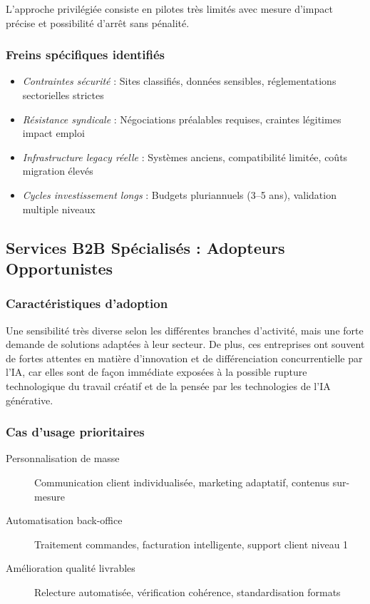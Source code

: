 L'approche privilégiée consiste en pilotes très limités avec mesure d'impact précise et possibilité d'arrêt sans pénalité.

\subsubsection{Freins spécifiques identifiés}
\begin{itemize}
    \item \emph{Contraintes sécurité} : Sites classifiés, données sensibles, réglementations sectorielles strictes
    \item \emph{Résistance syndicale} : Négociations préalables requises, craintes légitimes impact emploi
    \item \emph{Infrastructure legacy réelle} : Systèmes anciens, compatibilité limitée, coûts migration élevés
    \item \emph{Cycles investissement longs} : Budgets pluriannuels (3--5 ans), validation multiple niveaux
\end{itemize}

\subsection{Services B2B Spécialisés : Adopteurs Opportunistes}

\subsubsection{Caractéristiques d'adoption}
Une sensibilité très diverse selon les différentes branches d'activité, mais une forte demande de solutions adaptées à leur secteur. De plus, ces entreprises ont souvent de fortes attentes en matière d'innovation et de différenciation concurrentielle par l'IA, car elles sont de façon immédiate exposées à la possible rupture technologique du travail créatif et de la pensée par les technologies de l'IA générative.

\subsubsection{Cas d'usage prioritaires}
\begin{description}
    \item[Personnalisation de masse] Communication client individualisée, marketing adaptatif, contenus sur-mesure
    \item[Automatisation back-office] Traitement commandes, facturation intelligente, support client niveau 1
    \item[Amélioration qualité livrables] Relecture automatisée, vérification cohérence, standardisation formats
\end{description}

